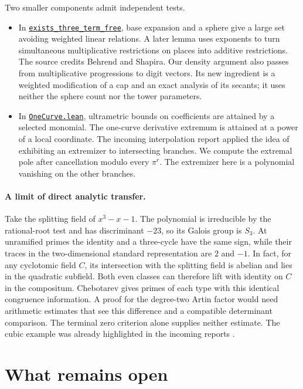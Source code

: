 \documentclass[11pt]{article}
\newcommand{\upstream}[2]{\href{https://github.com/lsernau/grh-lean/blob/72fead102f663d5c7a407964a13dc0cf9d977207/#1}{#2}}
\begin{document}
Two smaller components admit independent tests.
\begin{itemize}
\item In \upstream{grh/src/New/Reduction/Data/Existence.lean}{\texttt{exists\_three\_term\_free}}, base expansion and a sphere give a large set avoiding weighted linear relations. A later lemma uses exponents to turn simultaneous multiplicative restrictions on places into additive restrictions. The source credits Behrend and Shapira. Our density argument also passes from multiplicative progressions to digit vectors. Its new ingredient is a weighted modification of a cap and an exact analysis of its secants; it uses neither the sphere count nor the tower parameters.
\item In \upstream{grh/src/New/Derivatives/Sharpness/OneCurve.lean}{\texttt{OneCurve.lean}}, ultrametric bounds on coefficients are attained by a selected monomial. The one-curve derivative extremum is attained at a power of a local coordinate. The incoming interpolation report applied the idea of exhibiting an extremizer to intersecting branches. We compute the extremal pole after cancellation modulo every $\pi^r$. The extremizer here is a polynomial vanishing on the other branches.
\end{itemize}
\paragraph{A limit of direct analytic transfer.}
Take the splitting field of $x^3-x-1$. The polynomial is irreducible by the rational-root test and has discriminant $-23$, so its Galois group is $S_3$. At unramified primes the identity and a three-cycle have the same sign, while their traces in the two-dimensional standard representation are $2$ and $-1$. In fact, for any cyclotomic field $C$, its intersection with the splitting field is abelian and lies in the quadratic subfield. Both even classes can therefore lift with identity on $C$ in the compositum. Chebotarev gives primes of each type with this identical congruence information. A proof for the degree-two Artin factor would need arithmetic estimates that see this difference and a compatible determinant comparison. The terminal zero criterion alone supplies neither estimate. The cubic example was already highlighted in the incoming reports \cite{priorideal}.







\section{What remains open}
\end{document}
